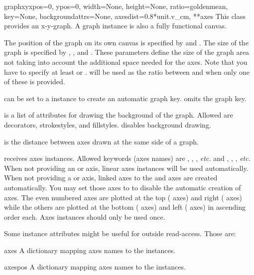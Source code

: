 \begin{classdesc}{graphxy}{xpos=0, ypos=0, width=None, height=None,
ratio=goldenmean, key=None, backgroundattrs=None,
axesdist=0.8*unit.v\_cm, **axes}
  This class provides an x-y-graph. A graph instance is also a fully
  functional canvas.

  The position of the graph on its own canvas is specified by
   and . The size of the graph is specified by
  , , and . These parameters define
  the size of the graph area not taking into account the additional
  space needed for the axes. Note that you have to specify at least
   or .  will be used as the ratio
  between  and  when only one of these is
  provided.

   can be set to a  instance to create
  an automatic graph key.  omits the graph key.

   is a list of attributes for drawing the
  background of the graph. Allowed are decorators, strokestyles, and
  fillstyles.  disables background drawing.

   is the distance between axes drawn at the same side
  of a graph.

   receives axes instances. Allowed keywords (axes names)
  are , , , \emph{etc.} and ,
  , , \emph{etc.} When not providing an  or
   axis, linear axes instances will be used automatically.
  When not providing a  or  axis, linked axes to the
   and  axes are created automatically. You may set
  those axes to  to disable the automatic creation of axes.
  The even numbered axes are plotted at the top ( axes) and
  right ( axes) while the others are plotted at the bottom
  ( axes) and left ( axes) in ascending order each.
  Axes instances should only be used once.
\end{classdesc}

Some instance attributes might be useful for outside read-access.
Those are:

\begin{memberdesc}{axes}
  A dictionary mapping axes names to the  instances.
\end{memberdesc}

\begin{memberdesc}{axespos}
  A dictionary mapping axes names to the  instances.
\end{memberdesc}

